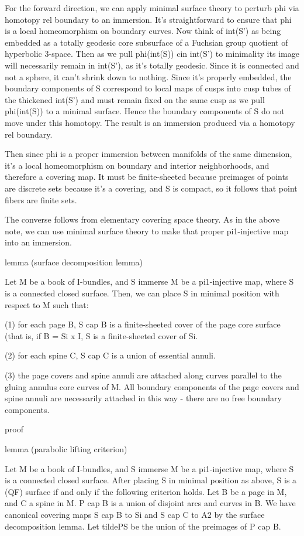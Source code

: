 For the forward direction, we can apply minimal surface theory to perturb phi
via homotopy rel boundary to an immersion. It's straightforward to ensure that
phi is a local homeomorphism on boundary curves. Now think of int(S') as being
embedded as a totally geodesic core subsurface of a Fuchsian group quotient of
hyperbolic 3-space.  Then as we pull phi(int(S)) cin int(S')  to minimality its
image will necessarily remain in int(S'), as it's totally geodesic.  Since it
is connected and not a sphere, it can't shrink down to nothing. Since it's
properly embedded, the boundary components of S correspond to local maps of
cusps into cusp tubes of the thickened int(S') and must remain fixed on the
same cusp as we pull phi(int(S)) to a minimal surface. Hence the boundary
components of S do not move under this homotopy. The result is an immersion
produced via a homotopy rel boundary.

Then since phi is a proper immersion between manifolds of the same dimension,
it's a local homeomorphism on boundary and interior neighborhoods, and
therefore a covering map. It must be finite-sheeted because preimages of points
are discrete sets because it's a covering, and S is compact, so it follows that
point fibers are finite sets.

The converse follows from elementary covering space theory. As in the above
note, we can use minimal surface theory to make that proper pi1-injective map
into an immersion.

lemma (surface decomposition lemma)

Let M be a book of I-bundles, and S immerse M be a pi1-injective map, where
S is a connected closed surface.  Then, we can place S in minimal position with
respect to M such that:

(1) for each page B, S cap B is a finite-sheeted cover of the page core surface
(that is, if B = Si x I, S is a finite-sheeted cover of Si.

(2) for each spine C, S cap C is a union of essential annuli.

(3) the page covers and spine annuli are attached along curves parallel to the
gluing annulus core curves of M. All boundary components of the page covers and
spine annuli are necessarily attached in this way - there are no free boundary
components.

proof


lemma (parabolic lifting criterion)

Let M be a book of I-bundles, and S immerse M be a pi1-injective map, where
S is a connected closed surface.  After placing S in minimal position as above,
S is a (QF) surface if and only if the following criterion holds. Let B be
a page in M, and C a spine in M. P cap B is a union of disjoint arcs and curves
in B. We have canonical covering maps S cap B to Si and S cap C to A2 by the
surface decomposition lemma. Let tildePS be the union of the preimages of P cap
B. %

